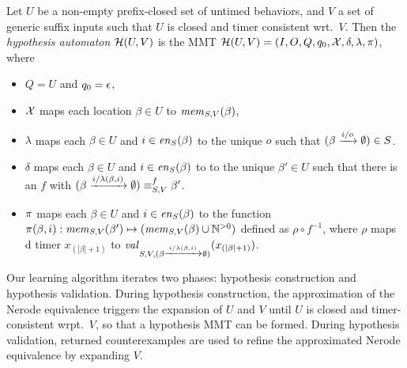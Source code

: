 \begin{definition}
  Let $U$ be a non-empty prefix-closed set of untimed behaviors,
  and $V$ a set of generic suffix inputs such that
$U$ is closed and timer consistent wrt.\ $V$. Then the
{\em hypothesis automaton} $\hypoof UV$ is the MMT
$\hypoof UV = (I, O, Q, q_0, \vars, \delta, \lambda, \remap)$, where
\begin{itemize}
\item $Q = U$ and $q_0 = \emptyword$,
\item $\vars$ maps each location $\beta\in U$ to $\apprgetmemorable{S}{\beta}{V}$,
\item $\lambda$ maps each $\beta \in U$ and $i \in \feasibleinputs{\beta}{S}$ to
  the unique $o$ such that $\extend{\beta}{i}{o} \in S$. 
\item $\delta$ maps each $\beta \in U$ and
  $i \in \feasibleinputs{\beta}{S}$ to
  to the unique $\beta' \in U$ such that there is an $f$ with
  $\extend{\beta}{i}{\lambda(\beta,i)} \equiv_{S,V}^f \beta'$.
\item $\remap$
 maps each $\beta \in U$ and $i \in \feasibleinputs{\beta}{S}$ to
  the function
  $\remap(\beta,i):\apprgetmemorable{S}{\beta'}{V} \mapsto (\apprgetmemorable{S}{\beta}{V} \cup \natplus)$ defined as $\rho \circ f^{-1}$, where $\rho$ maps  d
  timer $x_{(|\beta|+1)}$ to
 $\apprgetassignment{S}{\extend{\beta}{i}{\lambda(\beta,i)}}{V}(x_{(|\beta|+1)})$.
\end{itemize}
\end{definition}


Our learning algorithm iterates two phases: hypothesis construction and
hypothesis validation.
During hypothesis construction, 
the approximation of the Nerode equivalence triggers the expansion of
$U$ and $V$ until $U$ is closed and timer-consistent wrpt.\ $V$,
so that a hypothesis MMT can be formed.
During hypothesis validation, returned counterexamples are used to refine
the approximated Nerode equivalence by expanding $V$.

